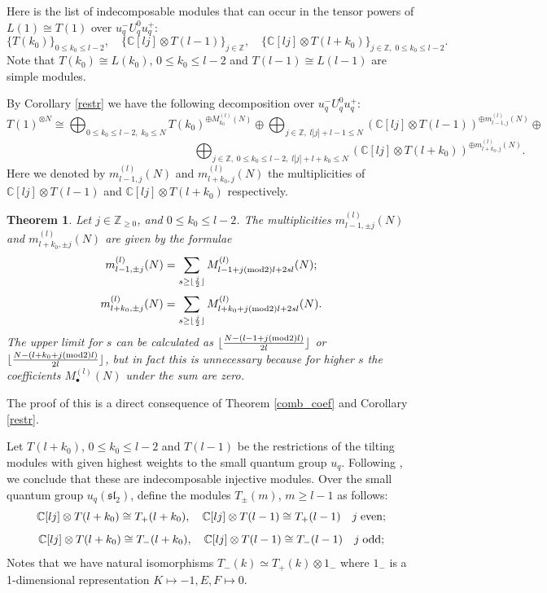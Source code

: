 \documentclass[11pt]{amsart}
\newcommand\lie[1]{\mathfrak{#1}}
\newcommand{\CC}{\mathbb{C}}
\newcommand{\Z}{\mathbb{Z}}
\newtheorem{theorem}{Theorem}[section]
\begin{document}
Here is the list of indecomposable modules that can occur in the tensor powers of $L(1) \cong  T(1)$ 
over $u_q^- U_q^0 u_q^+$: 
\[  \{ T(k_0)  \}_{0 \leq k_0 \leq l-2 } , \quad   \{  \CC[lj] \otimes T(l-1) \}_{j \in \Z} , \quad  
\{ \CC[lj] \otimes T(l + k_0) \}_{j \in \Z, \; 0 \leq k_0 \leq l-2} . \] 
Note that $T(k_0) \cong L(k_0)$, $ 0 \leq k_0 \leq l-2$ and $T(l-1)\cong L(l-1)$ are simple modules. 
 

By Corollary \ref{restr}  we have the following decomposition over  $u_q^- U_q^0 u_q^+$: 
\[ 
T(1)^{\otimes N} \cong \bigoplus_{0 \leq k_0 \leq l-2, \; k_0 \leq N} T(k_0)^{\oplus M_{k_0}^{(l)}(N)} \oplus \bigoplus_{j \in \Z, \; l|j| + l-1 \leq N}  (\CC[lj] \otimes T(l-1))^{\oplus m^{(l)}_{l-1,j}(N)}  \oplus  
\] 
\[ \;\;\;\;\;\;\;\;\;\;\;\;\;\;\;\;\;\;\;\;\;\;\;\;\;\;\;\;\;\;\;\;\;\;\;\;\;\;\;\;\;\;\;\;\;\;\;\;\;\;\;\;\;\;\;\;\;\;\;  \bigoplus_{j \in \Z, \; 
0 \leq k_0 \leq l-2, \; l|j| + l + k_0 \leq N} (\CC[lj] \otimes T(l + k_0))^{\oplus m^{(l)}_{l+k_0,j}(N)} .\] 
Here we denoted  by $m^{(l)}_{l-1,j}(N)$ and $m^{(l)}_{l+k_0,j}(N)$ the multiplicities of $\CC[lj] \otimes T(l-1)$
and $\CC[lj] \otimes T(l + k_0)$ respectively. 


\begin{theorem}  \label{uUu} 
Let $j \in \mathbb{Z}_{\geq 0}$, and $0 \leq k_0 \leq l-2$. The multiplicities $m^{(l)}_{l-1, \pm j}( N)$ and $m^{(l)}_{l+k_0, \pm j}( N)$ are given by the formulae 
\[ m^{(l)}_{l-1,\pm j}(N) =  \sum_{s \geq \lfloor \frac{j}{2} \rfloor}  M^{(l)}_{l-1+ j({\rm mod}2)l + 2sl}(N) ;  \] 
\[ m^{(l)}_{l+k_0,\pm j}(N)  = \sum_{s \geq \lfloor \frac{j}{2} \rfloor} M^{(l)}_{l+k_0+ j({\rm mod}2)l + 2sl}(N) . \]
The upper limit for $s$ can be calculated as $\lfloor \frac{N-(l-1+ j({\rm mod}2)l)}{2l}\rfloor$ or 
$\lfloor \frac{N-(l+k_0+ j({\rm mod}2)l)}{2l}\rfloor$, but in fact this is unnecessary because for higher $s$ 
 the coefficients $M^{(l)}_\bullet(N)$ under the sum are zero.  
\end{theorem} 
The proof of this is a direct consequence of Theorem \ref{comb_coef} and Corollary \ref{restr}. 
 

Let $T(l + k_0)$, $0 \leq k_0 \leq l-2$ and $T(l-1)$ be the restrictions of the tilting modules with given highest weights to the small quantum group $u_q$. Following  \cite{APW2}, we conclude that these are indecomposable injective modules. Over the small quantum group $u_q(\lie{sl}_2)$, define the modules $T_{\pm}(m)$, $m \geq l-1$ as follows: 
\[ \CC[lj] \otimes T(l+ k_0) \cong T_+(l+ k_0), \quad   \CC[lj] \otimes T(l-1) \cong T_+(l-1)  \quad j  \; {\rm even}  ; \] 
\[ \CC[lj] \otimes T(l+ k_0) \cong T_-(l+ k_0), \quad   \CC[lj] \otimes T(l-1) \cong T_-(l-1)  \quad j  \; {\rm odd}  ; \] 
Notes that we have natural isomorphisms $T_-(k)\simeq T_+(k)\otimes 1_{-}$ where $1_-$ is a
1-dimensional representation $K\mapsto -1, E,F\mapsto 0$.
\end{document}
